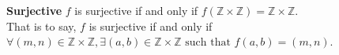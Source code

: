 \documentclass{article}
\begin{document}
\textbf{Surjective} \(f\) is surjective if and only if \(f(\mathbb{Z} \times \mathbb{Z}) = \mathbb{Z} \times \mathbb{Z}\). \\
That is to say, \(f\) is surjective if and only if \(\forall (m, n) \in \mathbb{Z} \times \mathbb{Z}, \exists (a, b) \in \mathbb{Z} \times \mathbb{Z} \text{ such that } f(a, b) = (m, n)\).
\end{document}
